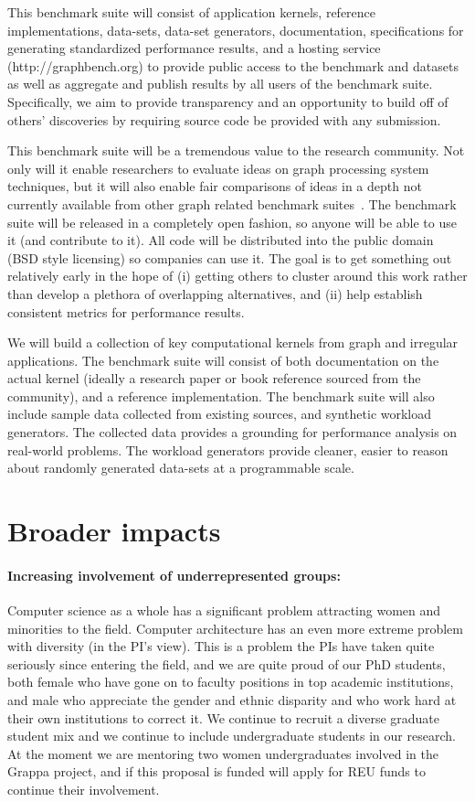 This benchmark suite will consist of application kernels, reference implementations, data-sets, data-set generators, documentation, specifications for generating standardized performance results, and a hosting service (http://graphbench.org) to provide public access to the benchmark and datasets as well as aggregate and publish results by all users of the benchmark suite.  Specifically, we aim to provide transparency and an opportunity to build off of others' discoveries by requiring source code be provided with any submission.

This benchmark suite will be a tremendous value to the research community. Not only will it enable researchers to evaluate ideas on graph processing system techniques, but it will also enable fair comparisons of ideas in a depth not currently available from other graph related benchmark suites~\cite{graph500}. The benchmark suite will be released in a completely open fashion, so anyone will be able to use it (and contribute to it).  All code will be distributed into the public domain (BSD style licensing) so companies can use it. The goal is to get something out relatively early in the hope of (i) getting others to cluster around this work rather than develop a plethora of overlapping alternatives, and (ii) help establish consistent metrics for performance results.

We will build a collection of key computational kernels from graph and irregular applications. The benchmark suite will consist of both documentation on the actual kernel (ideally a research paper or book reference sourced from the community), and a reference implementation. The benchmark suite will also include sample data collected from existing sources, and synthetic workload generators. The collected data provides a grounding for performance analysis on real-world problems. The workload generators provide cleaner, easier to reason about randomly generated data-sets at a programmable scale.

\section{Broader impacts}

\paragraph{Increasing involvement of underrepresented groups:} Computer science as a whole has a significant problem attracting women and minorities to the field.  Computer architecture has an even more extreme problem with diversity (in the PI's view).  This is a problem the PIs have taken quite seriously since entering the field, and we are quite proud of our PhD students, both female who have gone on to faculty positions in top academic institutions, and male who appreciate the gender and ethnic disparity and who work hard at their own institutions to correct it.  We continue to recruit a diverse graduate student mix and we continue to include undergraduate students in our research.  At the moment we are mentoring two women undergraduates involved in the Grappa project, and if this proposal is funded will apply for REU funds to continue their involvement.

